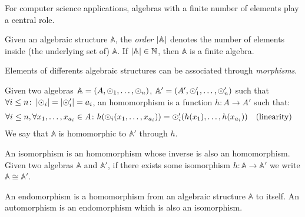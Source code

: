 For computer science applications, algebras with a finite number of elements play a central role.
\begin{definition}
  Given an algebraic structure \(\mathbb{A}\), the \emph{order} \(\left\lvert\mathbb{A}\right\rvert\) denotes the 
  number of elements inside (the underlying set of) \(\mathbb{A}\).
  If \(\left\lvert\mathbb{A}\right\rvert \in \mathbb{N}\), then \(\mathbb{A}\) is a finite algebra.
\end{definition}

Elements of differents algebraic structures can be associated through \emph{morphisms}.
\begin{definition}[Homomorphism]
  Given two algebras \(\mathbb{A} = \left(A, \odot_{1}, \dots, \odot_{n}\right)\), 
  \(\mathbb{A}' = \left(A', \odot'_{1}, \dots, \odot'_{n}\right)\) such that 
  \(\forall i \le n\colon \left\lvert\odot_i\right\rvert = \left\lvert\odot'_i\right\rvert = a_i\), an homomorphism is a function 
  \(h\colon A \to A'\) such that:
  \begin{align*}
    & \forall i \le n, \forall x_1,\dots, x_{a_{i}} \in A\colon 
    h(\odot_{i}(x_{1}, \dots, x_{a_{i}})) = \odot'_{i}(h(x_{1}), \dots, h(x_{a_{i}})) && 
    \textnormal{(linearity)}
  \end{align*}
  We say that \(\mathbb{A}\) is homomorphic to \(\mathbb{A}'\) through \(h\).
\end{definition}

\begin{definition}[Isomorphism]
  An isomorphism is an homomorphism whose inverse is also an homomorphism.
  Given two algebras \(\mathbb{A}\) and \(\mathbb{A}'\), if there exists some isomorphism 
  \(h\colon \mathbb{A} \to \mathbb{A}'\) we write \(\mathbb{A} \cong \mathbb{A}'\).
\end{definition}

\begin{definition}
  An endomorphism is a homomorphism from an algebraic structure \(\mathbb{A}\) to itself.
  An automorphism is an endomorphism which is also an isomorphism.
\end{definition}


